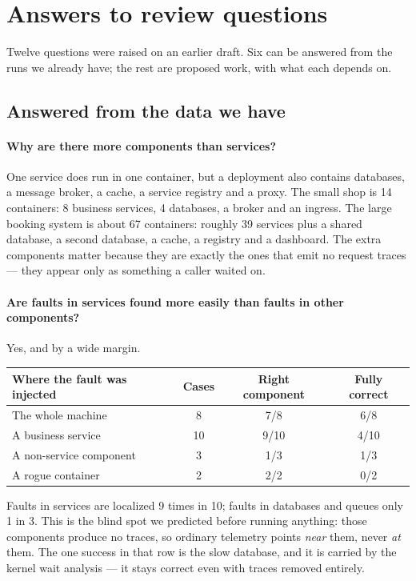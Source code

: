 \section{Answers to review questions}
\label{sec:questions}

Twelve questions were raised on an earlier draft. Six can be answered from the runs we
already have; the rest are proposed work, with what each depends on.

\subsection{Answered from the data we have}

\paragraph{Why are there more components than services?}
One service does run in one container, but a deployment also contains databases, a
message broker, a cache, a service registry and a proxy. The small shop is 14
containers: 8 business services, 4 databases, a broker and an ingress. The large
booking system is about 67 containers: roughly 39 services plus a shared database, a
second database, a cache, a registry and a dashboard. The extra components matter
because they are exactly the ones that emit no request traces --- they appear only as
something a caller waited on.

\paragraph{Are faults in services found more easily than faults in other components?}
Yes, and by a wide margin.

\begin{table}[h]
\centering\small
\begin{tabular}{lccc}
\toprule
Where the fault was injected & Cases & Right component & Fully correct \\
\midrule
The whole machine            & 8  & 7/8  & 6/8 \\
A business service           & 10 & 9/10 & 4/10 \\
A non-service component      & 3  & 1/3  & 1/3 \\
A rogue container            & 2  & 2/2  & 0/2 \\
\bottomrule
\end{tabular}
\end{table}

\noindent
Faults in services are localized 9 times in 10; faults in databases and queues only 1
in 3. This is the blind spot we predicted before running anything: those components
produce no traces, so ordinary telemetry points \emph{near} them, never \emph{at}
them. The one success in that row is the slow database, and it is carried by the
kernel wait analysis --- it stays correct even with traces removed entirely.

